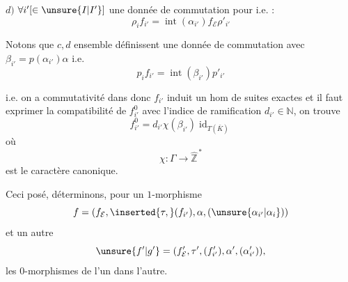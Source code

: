 $d)$ $\forall i'[\in\unsure{I|I'}]$ une donnée de commutation pour
i.e. :
\[
\boxed{\rho_i f_{i'}=\operatorname{int}(\alpha_{i'})f_{\mathcal E}\rho'_{i'}}
\]

Notons que $c,d$ ensemble définissent une donnée de commutation
avec $\beta_{i'}=p(\alpha_{i'})\alpha$
i.e.
\[
p_i f_{i'}=\operatorname{int}(\beta_{i'})p'_{i'}
\]


i.e. on a commutativité dans
donc $f_{i'}$ induit un hom de suites exactes
et il faut exprimer la compatibilité de $f^0_{i'}$ avec l'indice de ramification $d_{i'}\in\mathbb N$, on trouve
\[
\boxed{f^0_{i'}=d_{i'}\chi(\beta_{i'})\operatorname{id}_{T(\bar K)}}
\]
où
\[
\chi:\Gamma\longrightarrow\widehat{\mathbb Z}^{\,*}
\]
est le caractère canonique.

Ceci posé, déterminons, pour un $1$-morphisme
\[
f=(f_{\mathcal E},\inserted{\tau,}(f_{i'}),\alpha,(\unsure{\alpha_{i'}|\alpha_i}))
\]
et un autre
\[
\unsure{f'|g'}=(f'_{\mathcal E},\tau',(f'_{i'}),\alpha',(\alpha'_{i'})),
\]
les $0$-morphismes de l'un dans l'autre.
